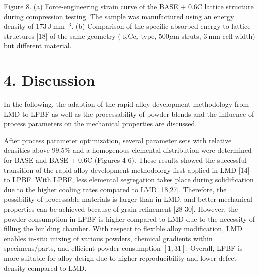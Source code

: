 \documentclass[10pt]{article}
\begin{document}
Figure 8. (a) Force-engineering strain curve of the BASE + 0.6C lattice structure during compression testing. The sample was manufactured using an energy density of $173 \mathrm{~J} \mathrm{~mm}^{-3}$. (b) Comparison of the specific absorbed energy to lattice structures [18] of the same geometry ( $\mathrm{f}_{2} \mathrm{Cc}_{\mathrm{z}}$ type, $500 \mu \mathrm{m}$ struts, $3 \mathrm{~mm}$ cell width) but different material.

\section*{4. Discussion}
In the following, the adaption of the rapid alloy development methodology from LMD to LPBF as well as the processability of powder blends and the influence of process parameters on the mechanical properties are discussed.

After process parameter optimization, several parameter sets with relative densities above $99.5 \%$ and a homogenous elemental distribution were determined for BASE and BASE + 0.6C (Figures 4-6). These results showed the successful transition of the rapid alloy development methodology first applied in LMD [14] to LPBF. With LPBF, less elemental segregation takes place during solidification due to the higher cooling rates compared to LMD [18,27]. Therefore, the possibility of processable materials is larger than in LMD, and better mechanical properties can be achieved because of grain refinement [28-30]. However, the powder consumption in LPBF is higher compared to LMD due to the necessity of filling the building chamber. With respect to flexible alloy modification, LMD enables in-situ mixing of various powders, chemical gradients within specimens/parts, and efficient powder consumption $[1,31]$. Overall, LPBF is more suitable for alloy design due to higher reproducibility and lower defect density compared to LMD.
\end{document}
